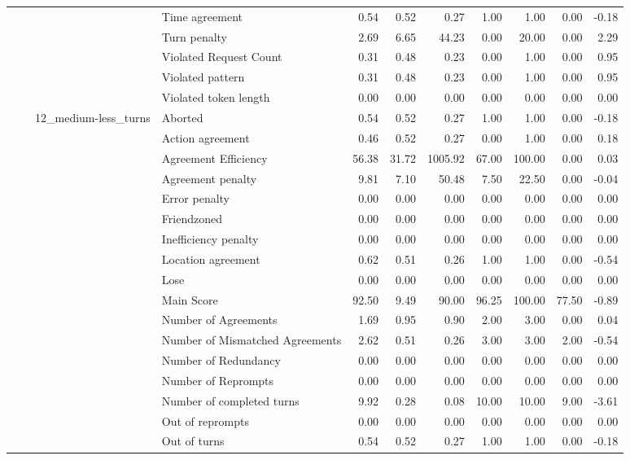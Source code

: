 \begin{tabular}{llllrrrrrrr}
 &  &  & Time agreement & 0.54 & 0.52 & 0.27 & 1.00 & 1.00 & 0.00 & -0.18 \\
 &  &  & Turn penalty & 2.69 & 6.65 & 44.23 & 0.00 & 20.00 & 0.00 & 2.29 \\
 &  &  & Violated Request Count & 0.31 & 0.48 & 0.23 & 0.00 & 1.00 & 0.00 & 0.95 \\
 &  &  & Violated pattern & 0.31 & 0.48 & 0.23 & 0.00 & 1.00 & 0.00 & 0.95 \\
 &  &  & Violated token length & 0.00 & 0.00 & 0.00 & 0.00 & 0.00 & 0.00 & 0.00 \\
\cline{3-11}
 &  & \multirow[t]{27}{*}{12_medium-less_turns} & Aborted & 0.54 & 0.52 & 0.27 & 1.00 & 1.00 & 0.00 & -0.18 \\
 &  &  & Action agreement & 0.46 & 0.52 & 0.27 & 0.00 & 1.00 & 0.00 & 0.18 \\
 &  &  & Agreement Efficiency & 56.38 & 31.72 & 1005.92 & 67.00 & 100.00 & 0.00 & 0.03 \\
 &  &  & Agreement penalty & 9.81 & 7.10 & 50.48 & 7.50 & 22.50 & 0.00 & -0.04 \\
 &  &  & Error penalty & 0.00 & 0.00 & 0.00 & 0.00 & 0.00 & 0.00 & 0.00 \\
 &  &  & Friendzoned & 0.00 & 0.00 & 0.00 & 0.00 & 0.00 & 0.00 & 0.00 \\
 &  &  & Inefficiency penalty & 0.00 & 0.00 & 0.00 & 0.00 & 0.00 & 0.00 & 0.00 \\
 &  &  & Location agreement & 0.62 & 0.51 & 0.26 & 1.00 & 1.00 & 0.00 & -0.54 \\
 &  &  & Lose & 0.00 & 0.00 & 0.00 & 0.00 & 0.00 & 0.00 & 0.00 \\
 &  &  & Main Score & 92.50 & 9.49 & 90.00 & 96.25 & 100.00 & 77.50 & -0.89 \\
 &  &  & Number of Agreements & 1.69 & 0.95 & 0.90 & 2.00 & 3.00 & 0.00 & 0.04 \\
 &  &  & Number of Mismatched Agreements & 2.62 & 0.51 & 0.26 & 3.00 & 3.00 & 2.00 & -0.54 \\
 &  &  & Number of Redundancy & 0.00 & 0.00 & 0.00 & 0.00 & 0.00 & 0.00 & 0.00 \\
 &  &  & Number of Reprompts & 0.00 & 0.00 & 0.00 & 0.00 & 0.00 & 0.00 & 0.00 \\
 &  &  & Number of completed turns & 9.92 & 0.28 & 0.08 & 10.00 & 10.00 & 9.00 & -3.61 \\
 &  &  & Out of reprompts & 0.00 & 0.00 & 0.00 & 0.00 & 0.00 & 0.00 & 0.00 \\
 &  &  & Out of turns & 0.54 & 0.52 & 0.27 & 1.00 & 1.00 & 0.00 & -0.18 \\

\end{tabular}
